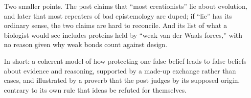 \begin{afterword}
Two smaller points. The post claims that ``most creationists'' lie about evolution, and later that most repeaters of bad epistemology are duped; if ``lie'' has its ordinary sense, the two claims are hard to reconcile. And its list of what a biologist would see includes proteins held by ``weak van der Waals forces,'' with no reason given why weak bonds count against design.

In short: a coherent model of how protecting one false belief leads to false beliefs about evidence and reasoning, supported by a made-up exchange rather than cases, and illustrated by a proverb that the post judges by its supposed origin, contrary to its own rule that ideas be refuted for themselves.
\end{afterword}
